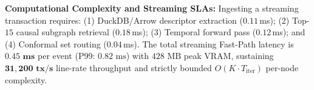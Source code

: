 \textbf{Computational Complexity and Streaming SLAs:} Ingesting a streaming transaction requires: (1) DuckDB/Arrow descriptor extraction ($0.11$\,ms); (2) Top-$15$ causal subgraph retrieval ($0.18$\,ms); (3) Temporal forward pass ($0.12$\,ms); and (4) Conformal set routing ($0.04$\,ms). The total streaming Fast-Path latency is $\mathbf{0.45\text{ ms}}$ per event (P99: $0.82\text{ ms}$) with $428\text{ MB}$ peak VRAM, sustaining $\mathbf{31{,}200\text{ tx/s}}$ line-rate throughput and strictly bounded $O(K \cdot T_{\text{iter}})$ per-node complexity.
